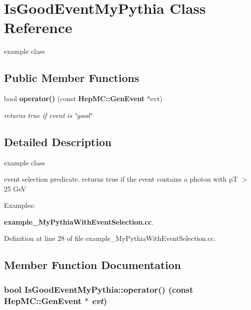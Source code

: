 \section{Is\-Good\-Event\-My\-Pythia Class Reference}
\label{classIsGoodEventMyPythia}
example class  


\subsection*{Public Member Functions}
\begin{CompactItemize}
\item 
bool {\bf operator()} (const {\bf Hep\-MC::Gen\-Event} $\ast$evt)
\begin{CompactList}\small\item\em returns true if event is \char`\"{}good\char`\"{} \item\end{CompactList}\end{CompactItemize}


\subsection{Detailed Description}
example class 

event selection predicate. returns true if the event contains a photon with p\-T $>$ 25 Ge\-V \begin{Desc}
\item[Examples: ]\par


{\bf example\_\-My\-Pythia\-With\-Event\-Selection.cc}.\end{Desc}




Definition at line 28 of file example\_\-My\-Pythia\-With\-Event\-Selection.cc.

\subsection{Member Function Documentation}
\subsubsection{\setlength{\rightskip}{0pt plus 5cm}bool Is\-Good\-Event\-My\-Pythia::operator() (const {\bf Hep\-MC::Gen\-Event} $\ast$ {\em evt})\hspace{0.3cm}{\tt  [inline]}}\label{classIsGoodEventMyPythia_d9cc41932485930274176d8d0d4171d1}


